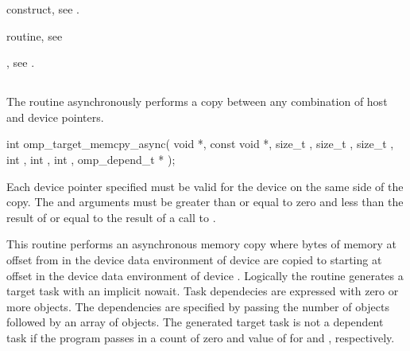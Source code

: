 \begin{crossrefs}
\item {} construct, see .

\item {} routine, see

\item {}, see
.
\end{crossrefs}

\subsection{}
\label{subsec:omp_target_memcpy_async}
\summary
The  routine asynchronously performs a copy between any combination of host and device pointers.
\format
\begin{samepage}
\begin{ompcFunction}
int omp_target_memcpy_async(
  void *,
  const void *,
  size_t ,
  size_t ,
  size_t ,
  int ,
  int ,
  int ,
  omp_depend_t *
);
\end{ompcFunction}
\end{samepage}

\constraints
Each device pointer specified must be valid for the device on the same side
of the copy. The  and
 arguments must be greater than or equal to zero and
less than the result of  or equal to
the result of a call to .

\effect
This routine performs an asynchronous memory copy where
 bytes of memory at offset  from 
in the device data environment of device  are
copied to  starting at offset  in the device data
environment of device .
Logically the  routine generates a target task with an implicit nowait.
Task dependecies are expressed with zero or more 
objects. The dependencies are specified by passing the
number of  objects followed by an array of
 objects.
The generated target task is not a dependent task if the program passes in a
count of zero and value of  for  and , respectively.

